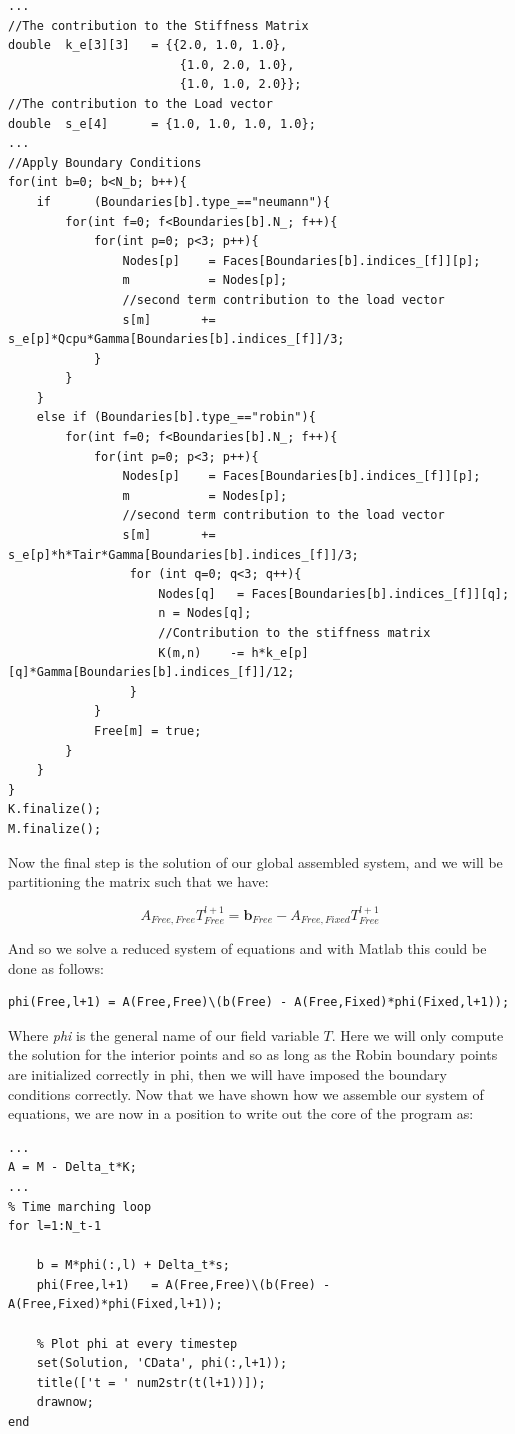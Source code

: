 \documentclass[12pt]{article}
\begin{document}
\begin{lstlisting}[style=MyC++Style]
...
//The contribution to the Stiffness Matrix
double	k_e[3][3]	= {{2.0, 1.0, 1.0}, 
						{1.0, 2.0, 1.0}, 
						{1.0, 1.0, 2.0}};
//The contribution to the Load vector
double	s_e[4]		= {1.0, 1.0, 1.0, 1.0};
...
//Apply Boundary Conditions
for(int b=0; b<N_b; b++){
	if		(Boundaries[b].type_=="neumann"){
		for(int f=0; f<Boundaries[b].N_; f++){
			for(int p=0; p<3; p++){
				Nodes[p]	= Faces[Boundaries[b].indices_[f]][p];
				m			= Nodes[p];
				//second term contribution to the load vector
				s[m]	   += s_e[p]*Qcpu*Gamma[Boundaries[b].indices_[f]]/3; 
			}
		}
	}
	else if	(Boundaries[b].type_=="robin"){
		for(int f=0; f<Boundaries[b].N_; f++){
			for(int p=0; p<3; p++){
				Nodes[p]	= Faces[Boundaries[b].indices_[f]][p];
				m			= Nodes[p];
				//second term contribution to the load vector
				s[m]	   += s_e[p]*h*Tair*Gamma[Boundaries[b].indices_[f]]/3; 
				 for (int q=0; q<3; q++){
					 Nodes[q]	= Faces[Boundaries[b].indices_[f]][q];
					 n = Nodes[q];
					 //Contribution to the stiffness matrix
					 K(m,n)    -= h*k_e[p][q]*Gamma[Boundaries[b].indices_[f]]/12; 
				 }
			}
			Free[m] = true;
		}
	}
}
K.finalize();
M.finalize();
\end{lstlisting}

Now the final step is the solution of our global assembled system, and we will be partitioning the matrix such that we have: 

$$
A_{Free,Free}T_{Free}^{l+1}=\textbf{b}_{Free}-A_{Free,Fixed}T_{Free}^{l+1}
$$

And so we solve a reduced system of equations and with Matlab this could be done as follows:

\begin{lstlisting}
phi(Free,l+1) = A(Free,Free)\(b(Free) - A(Free,Fixed)*phi(Fixed,l+1));
\end{lstlisting}

Where \textit{phi} is the general name of our field variable $T$. Here we will only compute the solution for the interior points and so as long as the Robin boundary points are initialized correctly in phi, then we will have imposed
the boundary conditions correctly. Now that we have shown how we assemble our system of equations, we are now in a position to write out the core of the program as:

\begin{lstlisting}
...
A = M - Delta_t*K;
...
% Time marching loop
for l=1:N_t-1
	
	b = M*phi(:,l) + Delta_t*s;
	phi(Free,l+1)	= A(Free,Free)\(b(Free) - A(Free,Fixed)*phi(Fixed,l+1));
	
	% Plot phi at every timestep
    set(Solution, 'CData', phi(:,l+1));
    title(['t = ' num2str(t(l+1))]);
    drawnow;
end
\end{lstlisting}
\end{document}
